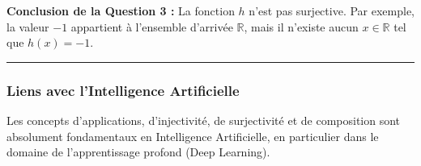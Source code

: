 \documentclass[12pt,a4paper]{report}
\begin{document}
\textbf{Conclusion de la Question 3 :} La fonction \(h\) n'est pas
surjective. Par exemple, la valeur \(-1\) appartient à l'ensemble
d'arrivée \(\mathbb{R}\), mais il n'existe aucun \(x \in \mathbb{R}\)
tel que \(h(x) = -1\).

\begin{center}\rule{0.5\linewidth}{0.5pt}\end{center}

\subsubsection{Liens avec l'Intelligence
Artificielle}\label{liens-avec-lintelligence-artificielle}

Les concepts d'applications, d'injectivité, de surjectivité et de
composition sont absolument fondamentaux en Intelligence Artificielle,
en particulier dans le domaine de l'apprentissage profond (Deep
Learning).
\end{document}
